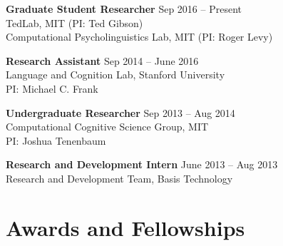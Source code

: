 \documentclass[11pt,]{article}
\begin{document}
\textbf{Graduate Student Researcher} \hfill Sep 2016 -- Present\\
\hspace*{0.333em}\hspace*{0.333em}\hspace*{0.333em}\hspace*{0.333em}TedLab,
MIT (PI: Ted Gibson)\\
\hspace*{0.333em}\hspace*{0.333em}\hspace*{0.333em}\hspace*{0.333em}Computational
Psycholinguistics Lab, MIT (PI: Roger Levy)

\textbf{Research Assistant} \hfill Sep 2014 -- June 2016\\
\hspace*{0.333em}\hspace*{0.333em}\hspace*{0.333em}\hspace*{0.333em}Language
and Cognition Lab, Stanford University\\
\hspace*{0.333em}\hspace*{0.333em}\hspace*{0.333em}\hspace*{0.333em}PI:
Michael C. Frank

\textbf{Undergraduate Researcher} \hfill Sep 2013 -- Aug 2014\\
\hspace*{0.333em}\hspace*{0.333em}\hspace*{0.333em}\hspace*{0.333em}Computational
Cognitive Science Group, MIT\\
\hspace*{0.333em}\hspace*{0.333em}\hspace*{0.333em}\hspace*{0.333em}PI:
Joshua Tenenbaum

\textbf{Research and Development Intern} \hfill June 2013 -- Aug 2013\\
\hspace*{0.333em}\hspace*{0.333em}\hspace*{0.333em}\hspace*{0.333em}Research
and Development Team, Basis Technology

\hypertarget{awards-and-fellowships}{%
\section{Awards and Fellowships}\label{awards-and-fellowships}}
\end{document}
